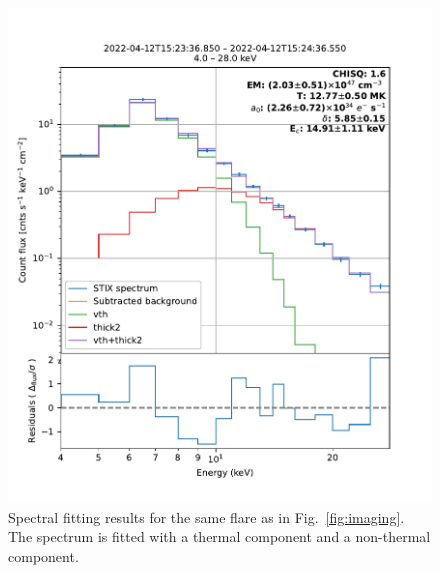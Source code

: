 \documentclass[referee]{aa} %
\begin{document}
\begin{figure}[h]
  \centering
  \includegraphics[width=0.95\linewidth]{figures/ospex.pdf} %
  \caption{Spectral fitting results for the same flare as in Fig.~\ref{fig:imaging}. The spectrum is fitted with a thermal component and a non-thermal component.}
  \label{fig:ospex}
\end{figure}
\end{document}
